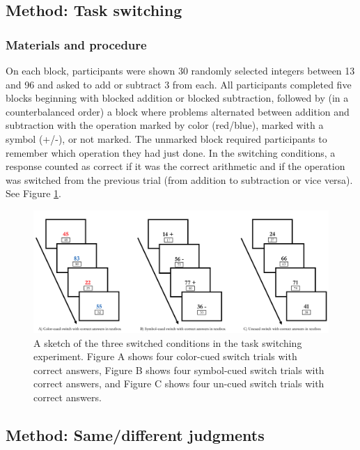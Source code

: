 \documentclass[
  man,a4paper,floatsintext]{apa6}
\begin{document}
\hypertarget{method-task-switching}{%
\subsection{Method: Task switching}\label{method-task-switching}}

\hypertarget{materials-and-procedure-2}{%
\subsubsection{Materials and procedure}\label{materials-and-procedure-2}}

On each block, participants were shown 30 randomly selected integers between 13 and 96 and asked to add or subtract 3 from each. All participants completed five blocks beginning with blocked addition or blocked subtraction, followed by (in a counterbalanced order) a block where problems alternated between addition and subtraction with the operation marked by color (red/blue), marked with a symbol (+/-), or not marked. The unmarked block required participants to remember which operation they had just done. In the switching conditions, a response counted as correct if it was the correct arithmetic and if the operation was switched from the previous trial (from addition to subtraction or vice versa). See Figure \ref{fig:task-switch-procedure}.

\begin{figure}[!ht]
\includegraphics[width=1\linewidth]{../figures/taskswitch} \caption{A sketch of the three switched conditions in the task switching experiment. Figure A shows four color-cued switch trials with correct answers, Figure B shows four symbol-cued switch trials with correct answers, and Figure C shows four un-cued switch trials with correct answers.}\label{fig:task-switch-procedure}
\end{figure}

\hypertarget{method-samedifferent-judgments}{%
\subsection{Method: Same/different judgments}\label{method-samedifferent-judgments}}
\end{document}
